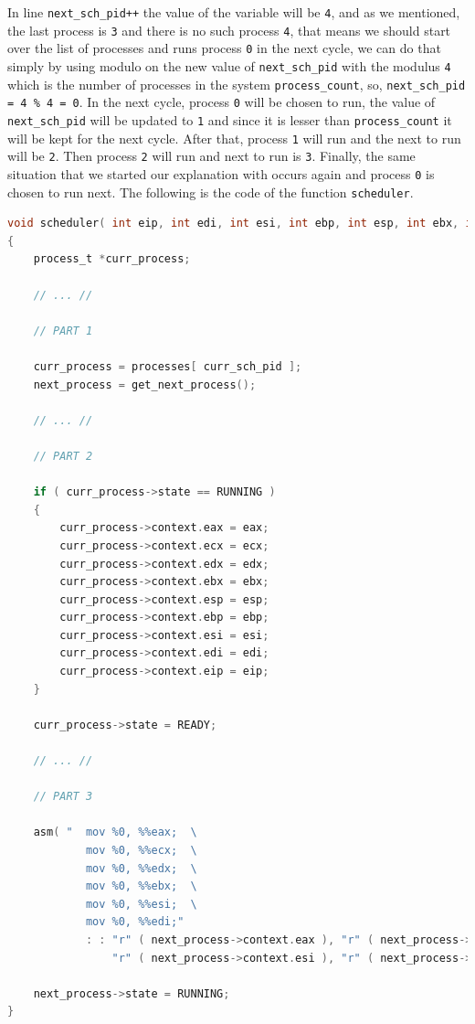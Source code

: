 In line \lstinline!next_sch_pid++! the value of the variable will be
\lstinline!4!, and as we mentioned, the last process is \lstinline!3!
and there is no such process \lstinline!4!, that means we should start
over the list of processes and runs process \lstinline!0! in the next
cycle, we can do that simply by using modulo on the new value of
\lstinline!next_sch_pid! with the modulus \lstinline!4! which is the
number of processes in the system \lstinline!process_count!, so,
\lstinline!next_sch_pid = 4 % 4 = 0!. In the next cycle, process
\lstinline!0! will be chosen to run, the value of
\lstinline!next_sch_pid! will be updated to \lstinline!1! and since it
is lesser than \lstinline!process_count! it will be kept for the next
cycle. After that, process \lstinline!1! will run and the next to run
will be \lstinline!2!. Then process \lstinline!2! will run and next to
run is \lstinline!3!. Finally, the same situation that we started our
explanation with occurs again and process \lstinline!0! is chosen to run
next. The following is the code of the function \lstinline!scheduler!.

\begin{lstlisting}[language=C]
void scheduler( int eip, int edi, int esi, int ebp, int esp, int ebx, int edx, int ecx, int eax )
{
    process_t *curr_process;
    
    // ... //
    
    // PART 1
    
    curr_process = processes[ curr_sch_pid ];
    next_process = get_next_process();
    
    // ... //
    
    // PART 2

    if ( curr_process->state == RUNNING )
    {
        curr_process->context.eax = eax;
        curr_process->context.ecx = ecx;
        curr_process->context.edx = edx;
        curr_process->context.ebx = ebx;
        curr_process->context.esp = esp;
        curr_process->context.ebp = ebp;
        curr_process->context.esi = esi;
        curr_process->context.edi = edi;
        curr_process->context.eip = eip;
    }
    
    curr_process->state = READY;
    
    // ... //
    
    // PART 3
    
    asm( "  mov %0, %%eax;  \
            mov %0, %%ecx;  \
            mov %0, %%edx;  \
            mov %0, %%ebx;  \
            mov %0, %%esi;  \
            mov %0, %%edi;" 
            : : "r" ( next_process->context.eax ), "r" ( next_process->context.ecx ), "r" ( next_process->context.edx ), "r" ( next_process->context.ebx ),
                "r" ( next_process->context.esi ), "r" ( next_process->context.edi ) );
    
    next_process->state = RUNNING;
}
\end{lstlisting}

